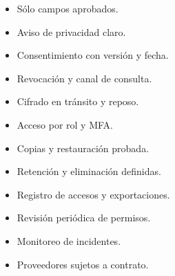 \documentclass[11pt,a4paper]{article}
\begin{document}
\vspace{4mm}
\begin{minipage}[t]{.315\textwidth}
  \begin{card}[height=55mm,fontupper=\small]
    \begin{itemize}
      \item Sólo campos aprobados.
      \item Aviso de privacidad claro.
      \item Consentimiento con versión y fecha.
      \item Revocación y canal de consulta.
    \end{itemize}
  \end{card}
\end{minipage}\hfill
\begin{minipage}[t]{.315\textwidth}
  \begin{card}[height=55mm,fontupper=\small]
    \begin{itemize}
      \item Cifrado en tránsito y reposo.
      \item Acceso por rol y MFA.
      \item Copias y restauración probada.
      \item Retención y eliminación definidas.
    \end{itemize}
  \end{card}
\end{minipage}\hfill
\begin{minipage}[t]{.315\textwidth}
  \begin{card}[height=55mm,fontupper=\small]
    \begin{itemize}
      \item Registro de accesos y exportaciones.
      \item Revisión periódica de permisos.
      \item Monitoreo de incidentes.
      \item Proveedores sujetos a contrato.
    \end{itemize}
  \end{card}
\end{minipage}
\end{document}
